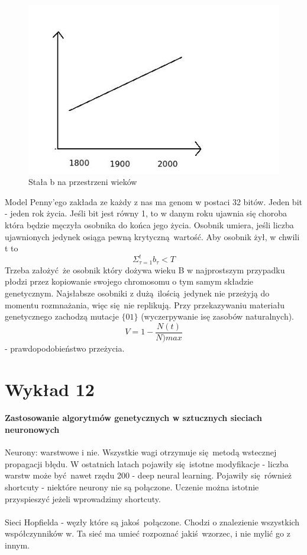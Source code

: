 \documentclass{article}
\begin{document}
					\begin{figure}[ht]
						\label{fig:fig2}
						\centering
						\includegraphics[scale=0.5]{stalab.jpeg}
						\caption{Stała b na przestrzeni wieków}
					\end{figure}
		Model Penny'ego zakłada ze każdy z nas ma genom w postaci 32 bitów. Jeden bit - jeden rok życia. Jeśli bit jest równy 1, to w danym roku ujawnia się choroba która będzie męczyła osobnika do końca jego życia. Osobnik umiera, jeśli liczba ujawnionych jedynek osiąga pewną krytyczną wartość. Aby osobnik żył, w chwili t to $$\Sigma_{\tau=1}^{t}b_\tau <  T$$ 
		Trzeba założyć że osobnik który dożywa wieku B w najprostszym przypadku płodzi przez kopiowanie swojego chromosomu o tym samym składzie genetycznym. Najsłabsze osobniki z dużą ilością jedynek nie przeżyją do momentu rozmnażania, więc się nie replikują.
		 Przy przekazywaniu materiału genetycznego zachodzą mutacje $\{0 1 \}$ (wyczerpywanie isę zasobów naturalnych). 
		$$V = 1 - \frac{N(t)}{N){max}}$$ - prawdopodobieństwo przeżycia.
		
		\section{Wykład 12}
		\paragraph{Zastosowanie algorytmów genetycznych w sztucznych sieciach neuronowych}
		
		Neurony: warstwowe i nie. Wszystkie wagi otrzymuje się metodą wstecznej propagacji błędu. W ostatnich latach pojawiły się istotne modyfikacje - liczba warstw może być nawet rzędu 200 - deep neural learning. Pojawiły się również shortcuty - niektóre neurony nie są połączone. Uczenie można istotnie przyspieszyć jeżeli wprowadzimy shortcuty.
		
		\paragraph{}Sieci Hopfielda - węzły które są jakoś połączone. Chodzi o znalezienie wszystkich współczynników w. Ta sieć ma umieć rozpoznać jakiś wzorzec, i nie mylić go z innym.
		
		
\end{document}
